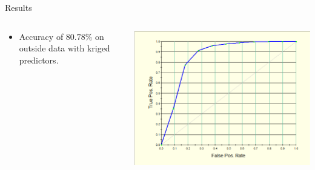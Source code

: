 \documentclass[10pt]{beamer}
\begin{document}
    \begin{frame}{Results}
        \begin{columns}[T]
            \begin{column}{.35 \textwidth}
                \begin{itemize}
                    \item Accuracy of $80.78\%$ on outside data with kriged predictors.
                \end{itemize}   
            \end{column}
            
            \begin{column}{.65\textwidth}
            \begin{center}
                \includegraphics[width = \textwidth]{ROCGBMKriged.png}
            \end{center}
            \end{column}
        \end{columns}
        \end{frame}
\end{document}

